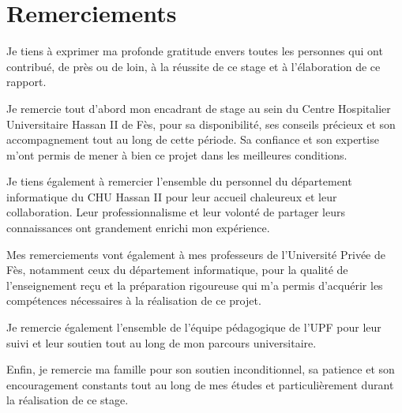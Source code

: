 \chapter*{Remerciements}

Je tiens à exprimer ma profonde gratitude envers toutes les personnes qui ont contribué, de près ou de loin, à la réussite de ce stage et à l'élaboration de ce rapport.

Je remercie tout d'abord mon encadrant de stage au sein du Centre Hospitalier Universitaire Hassan II de Fès, pour sa disponibilité, ses conseils précieux et son accompagnement tout au long de cette période. Sa confiance et son expertise m'ont permis de mener à bien ce projet dans les meilleures conditions.

Je tiens également à remercier l'ensemble du personnel du département informatique du CHU Hassan II pour leur accueil chaleureux et leur collaboration. Leur professionnalisme et leur volonté de partager leurs connaissances ont grandement enrichi mon expérience.

Mes remerciements vont également à mes professeurs de l'Université Privée de Fès, notamment ceux du département informatique, pour la qualité de l'enseignement reçu et la préparation rigoureuse qui m'a permis d'acquérir les compétences nécessaires à la réalisation de ce projet.

Je remercie également l'ensemble de l'équipe pédagogique de l'UPF pour leur suivi et leur soutien tout au long de mon parcours universitaire.

Enfin, je remercie ma famille pour son soutien inconditionnel, sa patience et son encouragement constants tout au long de mes études et particulièrement durant la réalisation de ce stage.
